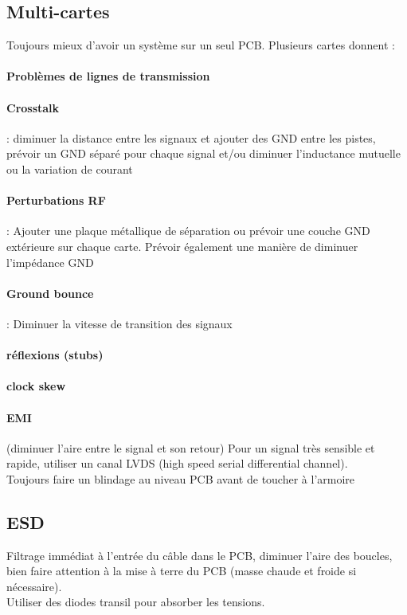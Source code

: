 \documentclass[resume]{subfiles}
\begin{document}
\begin{multicols}{3}
\subsection{Multi-cartes}
Toujours mieux d'avoir un système sur un seul PCB. Plusieurs cartes donnent :
\paragraph{Problèmes de lignes de transmission}
\paragraph{Crosstalk} : diminuer la distance entre les signaux et ajouter des GND entre les pistes, prévoir un GND séparé pour chaque signal et/ou diminuer l'inductance mutuelle ou la variation de courant
\paragraph{Perturbations RF} : Ajouter une plaque métallique de séparation ou prévoir une couche GND extérieure sur chaque carte. Prévoir également une manière de diminuer l'impédance GND
\paragraph{Ground bounce} : Diminuer la vitesse de transition des signaux
\paragraph{réflexions (stubs)}
\paragraph{clock skew}
\paragraph{EMI} (diminuer l'aire entre le signal et son retour)
Pour un signal très sensible et rapide, utiliser un canal LVDS (high speed serial differential channel).\\
Toujours faire un blindage au niveau PCB avant de toucher à l'armoire
\subsection{ESD}
Filtrage immédiat à l'entrée du câble dans le PCB, diminuer l'aire des boucles, bien faire attention à la mise à terre du PCB (masse chaude et froide si nécessaire).\\
Utiliser des diodes transil pour absorber les tensions.

\end{multicols}
\end{document}
